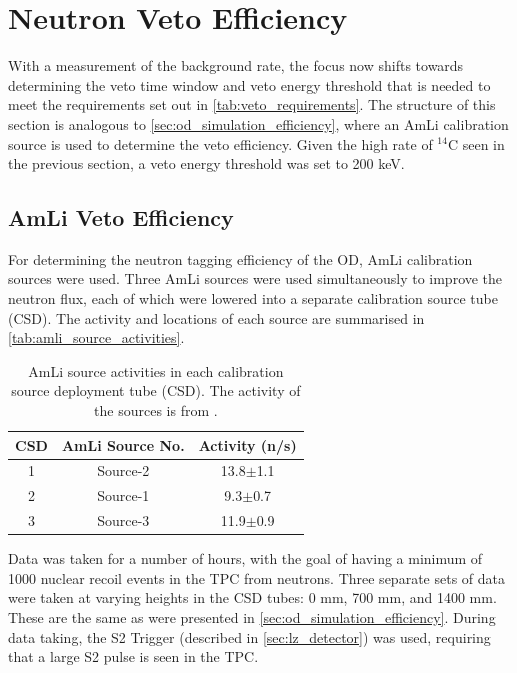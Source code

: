 \section{Neutron Veto Efficiency}
\label{sec:od_analysis_veto_efficiency}
\par
With a measurement of the background rate, the focus now shifts towards determining the veto time window and veto energy threshold that is needed to meet the requirements set out in \autoref{tab:veto_requirements}.
The structure of this section is analogous to \autoref{sec:od_simulation_efficiency}, where an AmLi calibration source is used to determine the veto efficiency.
Given the high rate of ${}^{14}$C seen in the previous section, a veto energy threshold was set to 200 keV.

\subsection{AmLi Veto Efficiency}
\par
For determining the neutron tagging efficiency of the OD, AmLi calibration sources were used.
Three AmLi sources were used simultaneously to improve the neutron flux, each of which were lowered into a separate calibration source tube (CSD).
The activity and locations of each source are summarised in \autoref{tab:amli_source_activities}.

\begin{table}[]
    \centering
    \begin{tabular}{c|c|c}
        CSD & AmLi Source No. & Activity (n/s) \\ \hline
        1   & Source-2        & 13.8$\pm$1.1           \\
        2   & Source-1        & 9.3$\pm$0.7            \\ 
        3   & Source-3        & 11.9$\pm$0.9                
    \end{tabular}
    \caption{AmLi source activities in each calibration source deployment tube (CSD).
             The activity of the sources is from \cite{LZ_TechnicalDesignReview_ref}.}
    \label{tab:amli_source_activities}
\end{table}

\par
Data was taken for a number of hours, with the goal of having a minimum of 1000 nuclear recoil events in the TPC from neutrons.
Three separate sets of data were taken at varying heights in the CSD tubes: 0 mm, 700 mm, and 1400 mm.
These are the same as were presented in \autoref{sec:od_simulation_efficiency}.
During data taking, the S2 Trigger (described in \autoref{sec:lz_detector}) was used, requiring that a large S2 pulse is seen in the TPC.

